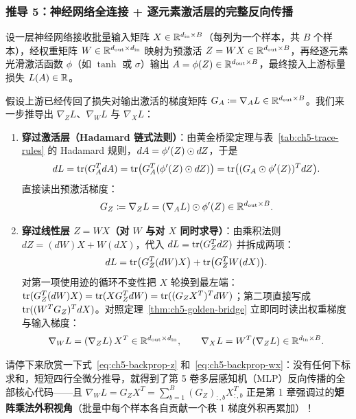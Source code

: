 \subsubsection{推导 5：神经网络全连接 + 逐元素激活层的完整反向传播}
设一层神经网络接收批量输入矩阵 $X\in\mathbb{R}^{d_{\text{in}}\times B}$（每列为一个样本，共 $B$ 个样本），经权重矩阵 $W\in\mathbb{R}^{d_{\text{out}}\times d_{\text{in}}}$ 映射为预激活 $Z = W X \in \mathbb{R}^{d_{\text{out}}\times B}$，再经逐元素光滑激活函数 $\phi$（如 $\tanh$ 或 $\sigma$）输出 $A = \phi(Z) \in \mathbb{R}^{d_{\text{out}}\times B}$，最终接入上游标量损失 $L(A)\in\mathbb{R}$。

假设上游已经传回了损失对输出激活的梯度矩阵 $G_A \coloneqq \nabla_A L \in \mathbb{R}^{d_{\text{out}}\times B}$。我们来一步推导出 $\nabla_Z L$、$\nabla_W L$ 与 $\nabla_X L$：
\begin{enumerate}
  \item \textbf{穿过激活层（Hadamard 链式法则）}：由黄金桥梁定理与表~\ref{tab:ch5-trace-rules} 的 Hadamard 规则，$dA = \phi'(Z) \odot dZ$，于是
  \[
    dL = \operatorname{tr}(G_A^T dA) = \operatorname{tr}\!\big(G_A^T (\phi'(Z) \odot dZ)\big) = \operatorname{tr}\!\big((G_A \odot \phi'(Z))^T dZ\big).
  \]
  直接读出预激活梯度：
  \begin{equation}\label{eq:ch5-backprop-z}
    G_Z \coloneqq \nabla_Z L = (\nabla_A L) \odot \phi'(Z) \in \mathbb{R}^{d_{\text{out}}\times B}.
  \end{equation}
  \item \textbf{穿过线性层 $Z = WX$（对 $W$ 与对 $X$ 同时求导）}：由乘积法则 $dZ = (dW)X + W(dX)$，代入 $dL = \operatorname{tr}(G_Z^T dZ)$ 并拆成两项：
  \[
    dL = \operatorname{tr}\!\big(G_Z^T (dW) X\big) + \operatorname{tr}\!\big(G_Z^T W (dX)\big).
  \]
  对第一项使用迹的循环不变性把 $X$ 轮换到最左端：$\operatorname{tr}(G_Z^T (dW) X) = \operatorname{tr}(X G_Z^T dW) = \operatorname{tr}((G_Z X^T)^T dW)$；第二项直接写成 $\operatorname{tr}((W^T G_Z)^T dX)$。对照定理~\ref{thm:ch5-golden-bridge} 立即同时读出权重梯度与输入梯度：
  \begin{equation}\label{eq:ch5-backprop-wx}
    \nabla_W L = (\nabla_Z L)\, X^T \in \mathbb{R}^{d_{\text{out}}\times d_{\text{in}}},
    \qquad
    \nabla_X L = W^T (\nabla_Z L) \in \mathbb{R}^{d_{\text{in}}\times B}.
  \end{equation}
\end{enumerate}
请停下来欣赏一下式~\eqref{eq:ch5-backprop-z} 和~\eqref{eq:ch5-backprop-wx}：没有任何下标求和，短短四行全微分推导，就得到了第 5 卷多层感知机（MLP）反向传播的全部核心代码——且 $\nabla_W L = G_Z X^T = \sum_{b=1}^B (G_Z)_{:,b} X_{:,b}^T$ 正是第 1 章强调过的\textbf{矩阵乘法外积视角}（批量中每个样本各自贡献一个秩 1 梯度外积再累加）！


